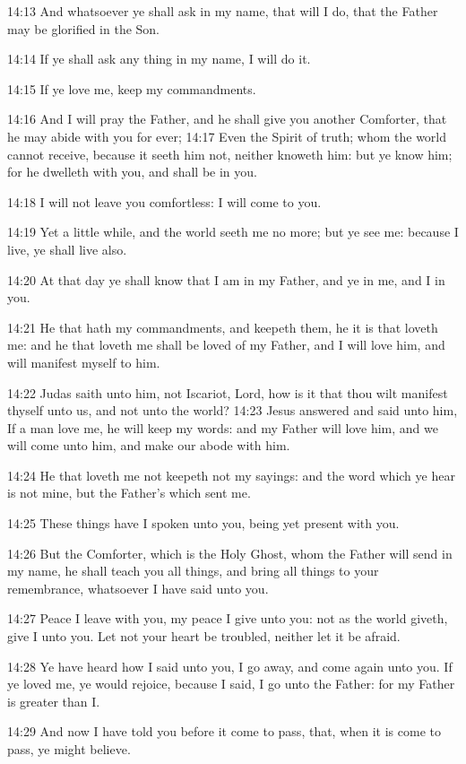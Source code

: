 14:13 And whatsoever ye shall ask in my name, that will I do, that the Father may be glorified in the Son.

14:14 If ye shall ask any thing in my name, I will do it.

14:15 If ye love me, keep my commandments.

14:16 And I will pray the Father, and he shall give you another Comforter, that he may abide with you for ever; 14:17 Even the Spirit of truth; whom the world cannot receive, because it seeth him not, neither knoweth him: but ye know him; for he dwelleth with you, and shall be in you.

14:18 I will not leave you comfortless: I will come to you.

14:19 Yet a little while, and the world seeth me no more; but ye see me: because I live, ye shall live also.

14:20 At that day ye shall know that I am in my Father, and ye in me, and I in you.

14:21 He that hath my commandments, and keepeth them, he it is that loveth me: and he that loveth me shall be loved of my Father, and I will love him, and will manifest myself to him.

14:22 Judas saith unto him, not Iscariot, Lord, how is it that thou wilt manifest thyself unto us, and not unto the world?  14:23 Jesus answered and said unto him, If a man love me, he will keep my words: and my Father will love him, and we will come unto him, and make our abode with him.

14:24 He that loveth me not keepeth not my sayings: and the word which ye hear is not mine, but the Father's which sent me.

14:25 These things have I spoken unto you, being yet present with you.

14:26 But the Comforter, which is the Holy Ghost, whom the Father will send in my name, he shall teach you all things, and bring all things to your remembrance, whatsoever I have said unto you.

14:27 Peace I leave with you, my peace I give unto you: not as the world giveth, give I unto you. Let not your heart be troubled, neither let it be afraid.

14:28 Ye have heard how I said unto you, I go away, and come again unto you. If ye loved me, ye would rejoice, because I said, I go unto the Father: for my Father is greater than I.

14:29 And now I have told you before it come to pass, that, when it is come to pass, ye might believe.

